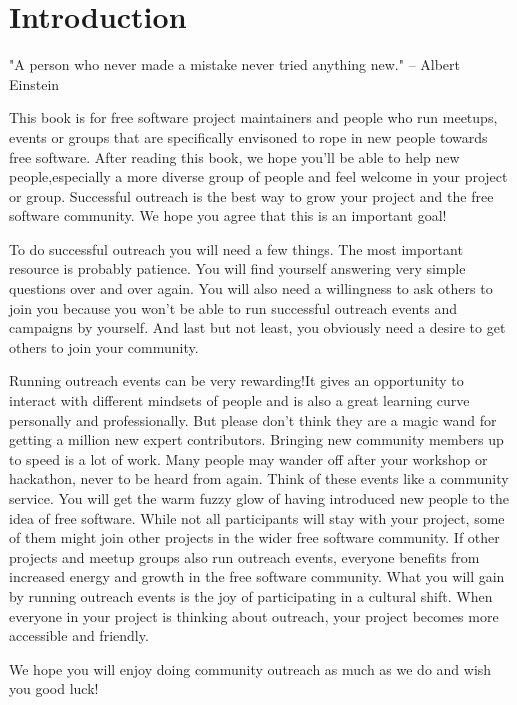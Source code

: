 \chapter{Introduction}

"A person who never made a mistake never tried anything new." -- Albert Einstein 

This book is for free software project maintainers and people who run meetups, events or groups that are specifically envisoned to rope in new people towards free software. After reading this book, we hope you’ll be able to help new people,especially a more diverse group of people and feel welcome in your project or group. Successful outreach is the best way to grow your project and the free software community. We hope you agree that this is an important goal! 

To do successful outreach you will need a few things. The most important resource is probably patience. You will find yourself answering very simple questions over and over again. You will also need a willingness to ask others to join you because you won’t be able to run successful outreach events and campaigns by yourself. And last but not least, you obviously need a desire to get others to join your community.

Running outreach events can be very rewarding!It gives an opportunity to interact with different mindsets of people and is also a great learning curve personally and professionally. But please don’t think they are a magic wand for getting a million new expert contributors. Bringing new community members up to speed is a lot of work. Many people may wander off after your workshop or hackathon, never to be heard from again. Think of these events like a community service. You will get the warm fuzzy glow of having introduced new people to the idea of free software. While not all participants will stay with your project, some of them might join other projects in the wider free software community. If other projects and meetup groups also run outreach events, everyone benefits from increased energy and growth in the free software community. What you will gain by running outreach events is the joy of participating in a cultural shift. When everyone in your project is thinking about outreach, your project becomes more accessible and friendly.

We hope you will enjoy doing community outreach as much as we do and wish you good luck!

\bookauthors {}

